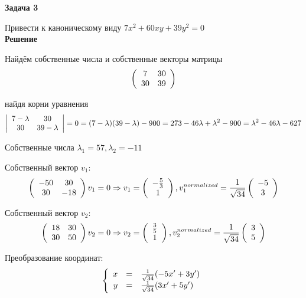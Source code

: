 \documentclass[12pt]{article}
\begin{document}
\begin{flushleft}
\textbf{Задача 3}
\par{Привести к каноническому виду $ 7x^2 + 60xy +39y^2 = 0$} \\
\textbf{Решение}
\par{Найдём собственные числа и собственные векторы матрицы} 
$$\left(
\begin{array}[c]{cc} 
7 & 30\\
30 & 39
\end{array}\right) 
$$
\par{найдя корни уравнения}
$$
\left|
\begin{array}[c]{cc} 
7-\lambda & 30\\
30 & 39-\lambda
\end{array}\right| 
=0=(7-\lambda)(39-\lambda) - 900 = 273-46\lambda+\lambda^{2} - 900 = \lambda^2 - 46\lambda - 627
$$
\par{Собственные числа $\lambda_{1} = 57, \lambda_{2} = -11$}
\par{Собственный вектор $v_{1}$:}
$$\left(
\begin{array}[c]{cc} 
-50 & 30\\
30 & -18
\end{array}\right) 
v_{1} = 0 \Rightarrow v_{1} = 
\left(\begin{array}[c]{c} 
-\frac{5}{3} \\
1
\end{array}\right),  v_{1}^{normalized}  = \frac{1}{\sqrt{34}}
\left(\begin{array}[c]{c} -5\\3\end{array}\right)
$$
\par{Собственный вектор $v_{2}$:}
$$\left(
\begin{array}[c]{cc} 
18 & 30\\
30 & 50
\end{array}\right) 
v_{2} = 0 \Rightarrow v_{2} = 
\left(\begin{array}[c]{c} 
\frac{3}{5} \\1\end{array}\right),
v_{2}^{normalized}  = \frac{1}{\sqrt{34}}
\left(\begin{array}[c]{c} 3\\5\end{array}\right)
$$
\par{Преобразование координат:}
$$\left\{
\begin{array}[c]{rcl} 
x & = & \frac{1}{\sqrt{34}}(-5x'+3y')\\
y & = & \frac{1}{\sqrt{34}}(3x'+5y')
\end{array}\right.
$$
\end{flushleft}
\end{document}
